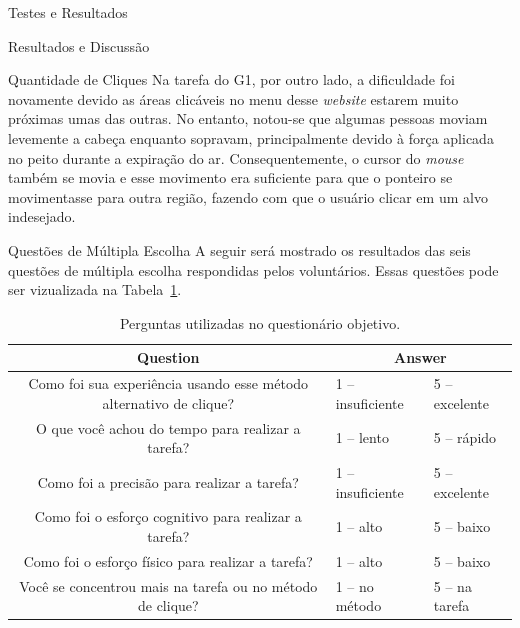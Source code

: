 \begin{chapter}{Testes e Resultados}
\begin{section}{Resultados e Discussão}
\begin{subsection}{Quantidade de Cliques}
Na tarefa do G1, por outro lado, a dificuldade foi novamente devido as áreas
clicáveis no menu desse \textit{website} estarem muito próximas umas das
outras. No entanto, notou-se que algumas pessoas moviam levemente a cabeça
enquanto sopravam, principalmente devido à força aplicada no peito durante a
expiração do ar. Consequentemente, o cursor do \textit{mouse} também se movia e
esse movimento era suficiente para que o ponteiro se movimentasse para outra
região, fazendo com que o usuário clicar em um alvo indesejado.
\end{subsection}

\begin{subsection}{Questões de Múltipla Escolha}
A seguir será mostrado os resultados das seis questões de múltipla escolha 
respondidas pelos voluntários. Essas questões pode ser vizualizada na
Tabela~\ref{tab:quest}.

\begin{table}[!h]
\centering
\small
\def\arraystretch{1.0}
\begin{tabular}{c|ll}
	\hline
	\hline
	 \textbf{Question} &\multicolumn{2}{c}{\textbf{Answer}} \\
	\hline
	 Como foi sua experiência usando esse método alternativo de clique? & 1 -- insuficiente        & 5 -- excelente   \\
	 O que você achou do tempo para realizar a tarefa?                  & 1 -- lento               & 5 -- rápido      \\
	 Como foi a precisão para realizar a tarefa?                        & 1 -- insuficiente        & 5 -- excelente   \\
	 Como foi o esforço cognitivo para realizar a tarefa?               & 1 -- alto                & 5 -- baixo       \\
	 Como foi o esforço físico para realizar a tarefa?                  & 1 -- alto                & 5 -- baixo       \\
	 Você se concentrou mais na tarefa ou no método de clique?          & 1 -- no método           & 5 -- na tarefa   \\
	\hline
	\hline
\end{tabular}
\caption{Perguntas utilizadas no questionário objetivo.}
\label{tab:quest}
\end{table}


\end{subsection}
\end{section}
\end{chapter}
